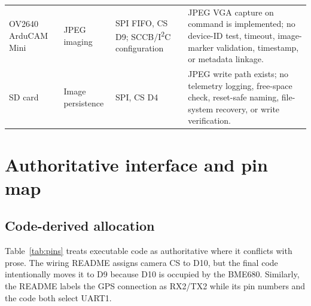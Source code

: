 \documentclass[11pt,a4paper]{article}
\begin{document}
\begin{longtable}{P{0.18\textwidth}P{0.20\textwidth}P{0.17\textwidth}P{0.33\textwidth}}
OV2640 ArduCAM Mini & JPEG imaging & SPI FIFO, CS D9; SCCB/I\textsuperscript{2}C configuration & JPEG VGA capture on command is implemented; no device-ID test, timeout, image-marker validation, timestamp, or metadata linkage.\\
SD card & Image persistence & SPI, CS D4 & JPEG write path exists; no telemetry logging, free-space check, reset-safe naming, file-system recovery, or write verification.\\
\bottomrule
\end{longtable}

\section{Authoritative interface and pin map}

\subsection{Code-derived allocation}

Table~\ref{tab:pins} treats executable code as authoritative where it conflicts with prose. The wiring README assigns camera CS to D10, but the final code intentionally moves it to D9 because D10 is occupied by the BME680. Similarly, the README labels the GPS connection as RX2/TX2 while its pin numbers and the code both select UART1.
\end{document}
